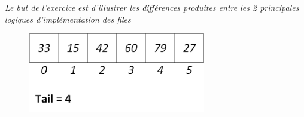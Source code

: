 \documentclass[11pt,a4paper]{article}
\begin{document}
\begin{center}
\textit{Le but de l'exercice est d'illustrer les différences produites entre les 2 principales logiques d'implémentation des files}
\end{center}


\begin{figure}[ht!]
\centering
\centerline{  %
\includegraphics[height=3.5cm]{img/file_t_1_A.png}
}
\end{figure}

\end{document}

